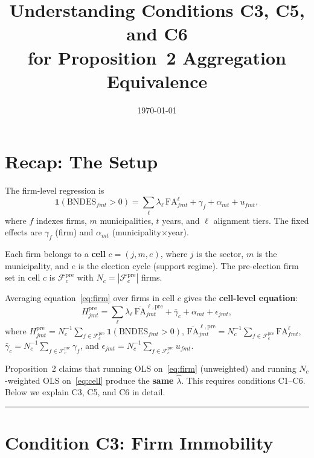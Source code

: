 \documentclass{article}
\newcommand{\FA}{\mathrm{FA}}
\newcommand{\ind}{\mathbf{1}}
\newcommand{\cFpre}{\mathcal{F}^{\mathrm{pre}}}
\theoremstyle{plain}
\theoremstyle{definition}
\begin{document}
\title{Understanding Conditions C3, C5, and C6\\
for Proposition~2 Aggregation Equivalence}
\author{}
\date{\today}
\maketitle

\section*{Recap: The Setup}

The firm-level regression is
\begin{equation}\label{eq:firm}
  \ind(\text{BNDES}_{fmt} > 0)
  = \sum_\ell \lambda_\ell\, \FA^\ell_{fmt}
  + \gamma_f + \alpha_{mt} + u_{fmt},
\end{equation}
where $f$ indexes firms, $m$ municipalities, $t$ years, and $\ell$ alignment
tiers.  The fixed effects are $\gamma_f$ (firm) and $\alpha_{mt}$
(municipality$\times$year).

Each firm belongs to a \textbf{cell} $c = (j, m, e)$, where $j$ is the sector,
$m$ is the municipality, and $e$ is the election cycle (support regime).  The
pre-election firm set in cell $c$ is $\cFpre_c$ with $N_c = |\cFpre_c|$ firms.

Averaging equation~\eqref{eq:firm} over firms in cell $c$ gives the
\textbf{cell-level equation}:
\begin{equation}\label{eq:cell}
  H^\mathrm{pre}_{jmt}
  = \sum_\ell \lambda_\ell\,
    \overline{\FA}^{\ell,\mathrm{pre}}_{jmt}
  + \bar\gamma_c + \alpha_{mt} + \epsilon_{jmt},
\end{equation}
where
$H^\mathrm{pre}_{jmt} = N_c^{-1}\sum_{f \in \cFpre_c} \ind(\text{BNDES}_{fmt} > 0)$,
$\overline{\FA}^{\ell,\mathrm{pre}}_{jmt} = N_c^{-1}\sum_{f \in \cFpre_c} \FA^\ell_{fmt}$,
$\bar\gamma_c = N_c^{-1}\sum_{f \in \cFpre_c} \gamma_f$, and
$\epsilon_{jmt} = N_c^{-1}\sum_{f \in \cFpre_c} u_{fmt}$.

Proposition~2 claims that running OLS on~\eqref{eq:firm} (unweighted) and
running $N_c$-weighted OLS on~\eqref{eq:cell} produce the \textbf{same}
$\hat\lambda$.  This requires conditions C1--C6.  Below we explain C3, C5, and
C6 in detail.

\bigskip
\hrule
\bigskip

\section{Condition C3: Firm Immobility}
\end{document}
